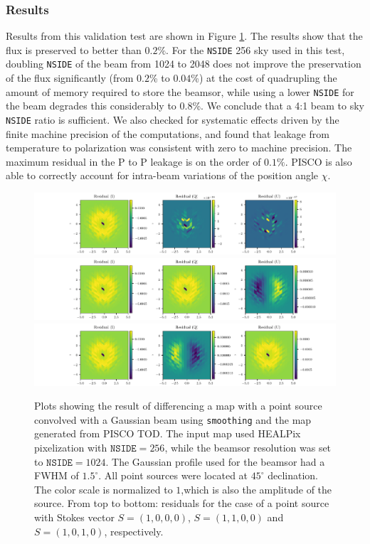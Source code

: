 \documentclass[a4paper,11pt]{article}
\begin{document}
\subsubsection{Results}

Results from this validation test are shown in Figure \ref{fig::stokesqsource256beam1024dec45}. The results show that the flux is preserved to better than $0.2\%$. For the \texttt{NSIDE} 256 sky used in this test, doubling \texttt{NSIDE} of the beam from 1024 to 2048 does not improve the preservation of the flux significantly (from $0.2$\% to $0.04$\%) at the cost of quadrupling the amount of memory required to store the beamsor, while using a lower \texttt{NSIDE} for the beam degrades this considerably to $0.8$\%. We conclude that a 4:1 beam to sky \texttt{NSIDE} ratio is sufficient. We also checked for systematic effects driven by the finite machine precision of the computations, and found that leakage from temperature to polarization was consistent with zero to machine precision. The maximum residual in the P to P leakage is on the order of $0.1\%$. PISCO is also able to correctly account for intra-beam variations of the position angle $\chi$.

\begin{figure}
	\centering
	\includegraphics[width=1.0\linewidth]{figures/figure5_3rd_I.pdf}
	\includegraphics[width=1.0\linewidth]{figures/figure5_3rd_Q.pdf}
	\includegraphics[width=1.0\linewidth]{figures/figure5_3rd_U.pdf}
	\caption{Plots showing the result of differencing a map with a point source convolved with a Gaussian beam using \texttt{smoothing} and the map generated from PISCO TOD. The input map used HEALPix pixelization with $\mathrm{\texttt{NSIDE}} = 256$, while the beamsor resolution was set to $\mathrm{\texttt{NSIDE}} = 1024$. The Gaussian profile used for the beamsor had a FWHM of $1.5^\circ$. All point sources were located at $45^\circ$ declination. The color scale is normalized to $1$,which is also the amplitude of the source. From top to bottom: residuals for the case of a point source with Stokes vector $S = (1,0,0,0)$, $S=(1,1,0,0)$ and $S=(1,0,1,0)$, respectively.}
	\label{fig::stokesqsource256beam1024dec45}
\end{figure}
\end{document}
